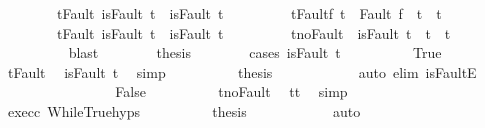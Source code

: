 \begin{isabellebody}
\ \ \ \ \ \ \ \ t{\isacharunderscore}Fault{\isacharcolon}\ {\isachardoublequoteopen}isFault\ t\ {\isasymlongrightarrow}\ isFault\ t{\isacharprime}{\isachardoublequoteclose}\ \isanewline
\ \ \ \ \ \ \ \ t{\isacharprime}{\isacharunderscore}Fault{\isacharunderscore}f{\isacharcolon}\ {\isachardoublequoteopen}t{\isacharprime}\ {\isacharequal}\ Fault\ f\ {\isasymlongrightarrow}\ t{\isacharprime}\ {\isacharequal}\ t{\isachardoublequoteclose}\ \isanewline
\ \ \ \ \ \ \ \ t{\isacharprime}{\isacharunderscore}Fault{\isacharcolon}\ {\isachardoublequoteopen}isFault\ t{\isacharprime}\ {\isasymlongrightarrow}\ isFault\ t{\isachardoublequoteclose}\ \isanewline
\ \ \ \ \ \ \ \ t{\isacharprime}{\isacharunderscore}noFault{\isacharcolon}\ {\isachardoublequoteopen}{\isasymnot}\ isFault\ t{\isacharprime}\ {\isasymlongrightarrow}\ t{\isacharprime}\ {\isacharequal}\ t{\isachardoublequoteclose}\isanewline
\ \ \ \ \ \ \ \ \isamarkupfalse%
\ blast\isanewline
\ \ \ \ \ \ \isamarkupfalse%
\ {\isacharquery}thesis\isanewline
\ \ \ \ \ \ \isamarkupfalse%
\ {\isacharparenleft}cases\ {\isachardoublequoteopen}isFault\ t{\isacharprime}{\isachardoublequoteclose}{\isacharparenright}\isanewline
\ \ \ \ \ \ \ \ \isamarkupfalse%
\ True\isanewline
\ \ \ \ \ \ \ \ \isamarkupfalse%
\ t{\isacharprime}{\isacharunderscore}Fault\ \isamarkupfalse%
\ {\isachardoublequoteopen}isFault\ t{\isachardoublequoteclose}\ \isamarkupfalse%
\ simp\isanewline
\ \ \ \ \ \ \ \ \isamarkupfalse%
\ {\isacharquery}thesis\isanewline
\ \ \ \ \ \ \ \ \ \ \isamarkupfalse%
\ {\isacharparenleft}auto\ elim{\isacharcolon}\ isFaultE{\isacharparenright}\isanewline
\ \ \ \ \ \ \isamarkupfalse%
\isanewline
\ \ \ \ \ \ \ \ \isamarkupfalse%
\ False\isanewline
\ \ \ \ \ \ \ \ \isamarkupfalse%
\ t{\isacharprime}{\isacharunderscore}noFault\ \isamarkupfalse%
\ {\isachardoublequoteopen}t{\isacharprime}{\isacharequal}t{\isachardoublequoteclose}\ \isamarkupfalse%
\ simp\isanewline
\ \ \ \ \ \ \ \ \isamarkupfalse%
\ exec{\isacharunderscore}c{}\ WhileTrue{\isachardot}hyps\isanewline
\ \ \ \ \ \ \ \ \isamarkupfalse%
\ {\isacharquery}thesis\isanewline
\ \ \ \ \ \ \ \ \ \ \isamarkupfalse%
\ auto\isanewline
\ \ \ \ \ \ \isamarkupfalse%
\isanewline
\ \ \ \ \isamarkupfalse%
\ \ \isanewline

\end{isabellebody}

